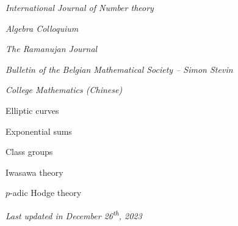 \documentclass[11pt]{article}
\begin{document}
\begin{cvlist}
	\item {\em International Journal of Number theory}
	\item {\em Algebra Colloquium}
	\item {\em The Ramanujan Journal}
	\item {\em Bulletin of the Belgian Mathematical Society – Simon Stevin}
	\item {\em College Mathematics (Chinese)}
\end{cvlist}


\begin{cvlist}
	\item Elliptic curves
	\item Exponential sums
	\item Class groups
	\item Iwasawa theory
	\item $p$-adic Hodge theory
\end{cvlist}


\medskip\emph{Last updated in December 26\textsuperscript{th}, 2023}
\end{document}
